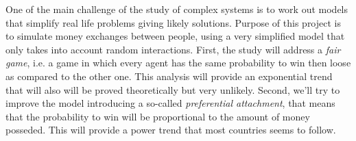 One of the main challenge of the study of complex systems is to work out models that simplify real life problems giving likely solutions.
Purpose of this project is to simulate money exchanges between people, using a very simplified model that only takes into account random interactions.
First, the study will address a \emph{fair game}, i.e. a game in which every agent has the same probability to win then loose as compared to the other one.
This analysis will provide an exponential trend that will also will be proved theoretically but very unlikely.
Second, we'll try to improve the model introducing a so-called \emph{preferential attachment}, that means that the probability to win will be proportional to the amount of money posseded.
This will provide a power trend that most countries seems to follow.
